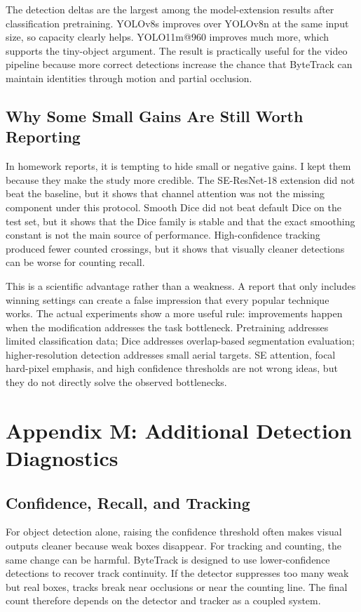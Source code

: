 \documentclass[10pt,twocolumn]{article}
\begin{document}
The detection deltas are the largest among the model-extension results after classification pretraining. YOLOv8s improves over YOLOv8n at the same input size, so capacity clearly helps. YOLO11m@960 improves much more, which supports the tiny-object argument. The result is practically useful for the video pipeline because more correct detections increase the chance that ByteTrack can maintain identities through motion and partial occlusion.

\subsection{Why Some Small Gains Are Still Worth Reporting}

In homework reports, it is tempting to hide small or negative gains. I kept them because they make the study more credible. The SE-ResNet-18 extension did not beat the baseline, but it shows that channel attention was not the missing component under this protocol. Smooth Dice did not beat default Dice on the test set, but it shows that the Dice family is stable and that the exact smoothing constant is not the main source of performance. High-confidence tracking produced fewer counted crossings, but it shows that visually cleaner detections can be worse for counting recall.

This is a scientific advantage rather than a weakness. A report that only includes winning settings can create a false impression that every popular technique works. The actual experiments show a more useful rule: improvements happen when the modification addresses the task bottleneck. Pretraining addresses limited classification data; Dice addresses overlap-based segmentation evaluation; higher-resolution detection addresses small aerial targets. SE attention, focal hard-pixel emphasis, and high confidence thresholds are not wrong ideas, but they do not directly solve the observed bottlenecks.

\section{Appendix M: Additional Detection Diagnostics}

\subsection{Confidence, Recall, and Tracking}

For object detection alone, raising the confidence threshold often makes visual outputs cleaner because weak boxes disappear. For tracking and counting, the same change can be harmful. ByteTrack is designed to use lower-confidence detections to recover track continuity. If the detector suppresses too many weak but real boxes, tracks break near occlusions or near the counting line. The final count therefore depends on the detector and tracker as a coupled system.
\end{document}
